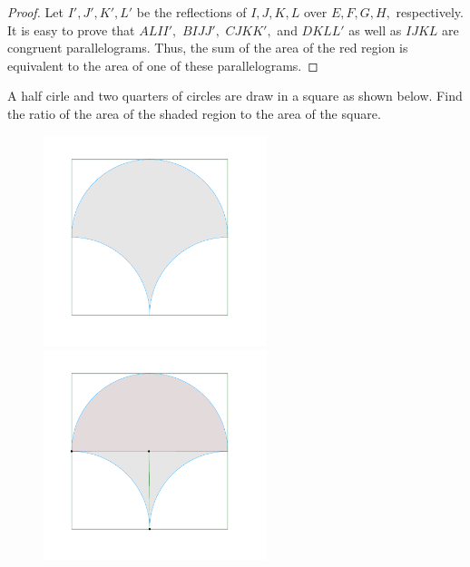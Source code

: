 \documentclass{article}
\begin{document}
\begin{proof}
    Let $I', J', K', L'$ be the reflections of $I, J, K, L$ over $E, F, G, H,$ respectively.
    It is easy to prove that $ALII',$ $BIJJ',$ $CJKK',$ and $DKLL'$ as well as $IJKL$ are congruent parallelograms.
    Thus, the sum of the area of the red region is equivalent to the area of one of these parallelograms.
\end{proof}

\begin{example*}[Example 8]
    \label{example:23-24-s3-i-p8}
    A half cirle and two quarters of circles are draw in a square as shown below.
    Find the ratio of the area of the shaded region to the area of the square.
\end{example*}

\begin{figure}[h]
    \centering
    \begin{minipage}[t]{6.5cm}
        \begin{center}
            \includegraphics[width=6.5cm]{./svg/pdf/23-24-s3-i-p8.pdf}
        \end{center}
    \end{minipage}
    \qquad
    \begin{minipage}[t]{6.5cm}
        \centering
        \begin{center}
            \includegraphics[width=6.5cm]{./svg/pdf/23-24-s3-i-p8-s.pdf}
        \end{center}
    \end{minipage}
\end{figure}
\end{document}
